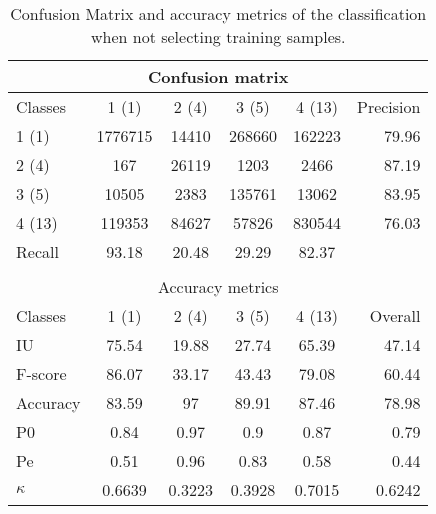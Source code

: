 \begin{table}[H]
\begin{center}
\footnotesize
\begin{tabular}{|l|c|c|c|c|r|}
\hline
\multicolumn{6}{|c|}{Confusion matrix} \\
\hline
 Classes & 1 (1) & 2 (4) & 3 (5) & 4 (13) & Precision \\
\hline
1 (1) & 1776715 & 14410 & 268660 & 162223 & 79.96 \\
\hline
2 (4) & 167 & 26119 & 1203 & 2466 & 87.19 \\
\hline
3 (5) & 10505 & 2383 & 135761 & 13062 & 83.95 \\
\hline
4 (13) & 119353 & 84627 & 57826 & 830544 & 76.03 \\
\hline
Recall & 93.18 & 20.48 & 29.29 & 82.37 &  \\
\hline
\multicolumn{6}{c}{ } \\
\hline
\multicolumn{6}{|c|}{Accuracy metrics} \\
\hline
 Classes & 1 (1) & 2 (4) & 3 (5) & 4 (13) & Overall \\
\hline
IU & 75.54 & 19.88 & 27.74 & 65.39 & 47.14 \\
\hline
F-score & 86.07 & 33.17 & 43.43 & 79.08 & 60.44 \\
\hline
Accuracy & 83.59 & 97 & 89.91 & 87.46 & 78.98 \\
\hline
P0 & 0.84 & 0.97 & 0.9 & 0.87 & 0.79 \\
\hline
Pe & 0.51 & 0.96 & 0.83 & 0.58 & 0.44 \\
\hline
$\kappa$ & 0.6639 & 0.3223 & 0.3928 & 0.7015 & 0.6242 \\
\hline
\end{tabular}
\caption{Confusion Matrix and accuracy metrics of the classification when not selecting training samples.}
\label{table:C3_S3_ss3_classif_without_training}
\end{center}
\end{table}